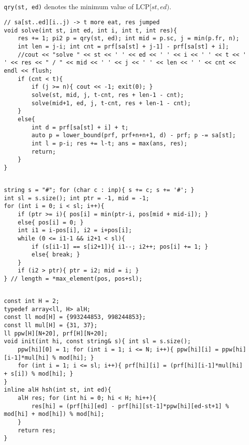 \documentclass[landscape, 8pt, a4paper, oneside, twocolumn]{extarticle}
\begin{document}
\subsection{}
\texttt{qry(st, ed)} denotes the minimum value of $\mathrm{LCP}[st, ed)$.
\begin{verbatim}
// sa[st..ed][i..j) -> t more eat, res jumped
void solve(int st, int ed, int i, int t, int res){
	res += 1; pi2 p = qry(st, ed); int mid = p.sc, j = min(p.fr, n);
	int len = j-i; int cnt = prf[sa[st] + j-1] - prf[sa[st] + i];
	//cout << "solve " << st << ' ' << ed << ' ' << i << ' ' << t << ' ' << res << " / " << mid << ' ' << j << ' ' << len << ' ' << cnt << endl << flush;
	if (cnt < t){
		if (j >= n){ cout << -1; exit(0); }
		solve(st, mid, j, t-cnt, res + len-1 - cnt);
		solve(mid+1, ed, j, t-cnt, res + len-1 - cnt);
	}
	else{
		int d = prf[sa[st] + i] + t;
		auto p = lower_bound(prf, prf+n+n+1, d) - prf; p -= sa[st];
		int l = p-i; res += l-t; ans = max(ans, res);
		return;
	}
}
\end{verbatim}
\subsection{}
\begin{verbatim}
string s = "#"; for (char c : inp){ s += c; s += '#'; }
int sl = s.size(); int ptr = -1, mid = -1;
for (int i = 0; i < sl; i++){
    if (ptr >= i){ pos[i] = min(ptr-i, pos[mid + mid-i]); }
    else{ pos[i] = 0; }
    int i1 = i-pos[i], i2 = i+pos[i];
    while (0 <= i1-1 && i2+1 < sl){
        if (s[i1-1] == s[i2+1]){ i1--; i2++; pos[i] += 1; }
        else{ break; }
    }
    if (i2 > ptr){ ptr = i2; mid = i; }
} // length = *max_element(pos, pos+sl);
\end{verbatim}
\subsection{}
\begin{verbatim}
const int H = 2;
typedef array<ll, H> alH;
const ll mod[H] = {993244853, 998244853};
const ll mul[H] = {31, 37};
ll ppw[H][N+20], prf[H][N+20];
void init(int hi, const string& s){ int sl = s.size();
    ppw[hi][0] = 1; for (int i = 1; i <= N; i++){ ppw[hi][i] = ppw[hi][i-1]*mul[hi] % mod[hi]; }
    for (int i = 1; i <= sl; i++){ prf[hi][i] = (prf[hi][i-1]*mul[hi] + s[i]) % mod[hi]; }
}
inline alH hsh(int st, int ed){
    alH res; for (int hi = 0; hi < H; hi++){
        res[hi] = (prf[hi][ed] - prf[hi][st-1]*ppw[hi][ed-st+1] % mod[hi] + mod[hi]) % mod[hi];
    }
    return res;
}
\end{verbatim}
\end{document}
